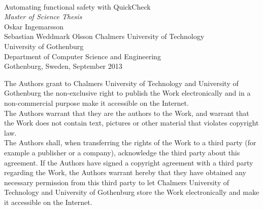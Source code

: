 \begin{titlepage}

  \mbox{}
  \vfill
  \addtolength{\voffset}{2cm}
  \begin{flushleft}
    { \\
      {\huge Automating functional safety with QuickCheck} \\
      \emph{\Large Master of Science Thesis} \\[.8cm]

      {\huge Oskar Ingemarsson}\\
      {\huge Sebastian Weddmark Olsson}
      \vfill
      {\normalsize Chalmers University of Technology \\
        University of Gothenburg \\
        Department of Computer Science and Engineering \\
        Gothenburg, Sweden, September 2013 \\
      }
    }
  \end{flushleft}

\end{titlepage}
\ClearShipoutPicture

\vspace*{2.5cm}
The Authors grant to Chalmers University of Technology and University of Gothenburg the non-exclusive right to publish the Work electronically and in a non-commercial purpose make it accessible on the Internet.\\
The Authors warrant that they are the authors to the Work, and warrant that the Work does not contain text, pictures or other material that violates copyright law. \\

The Authors shall, when transferring the rights of the Work to a third party (for example a publisher or a company), acknowledge the third party about this agreement. If the Authors have signed a copyright agreement with a third party regarding the Work, the Authors warrant hereby that they have obtained any necessary permission from this third party to let Chalmers University of Technology and University of Gothenburg  store the Work electronically and make it accessible on the Internet.\\[0.6cm]

